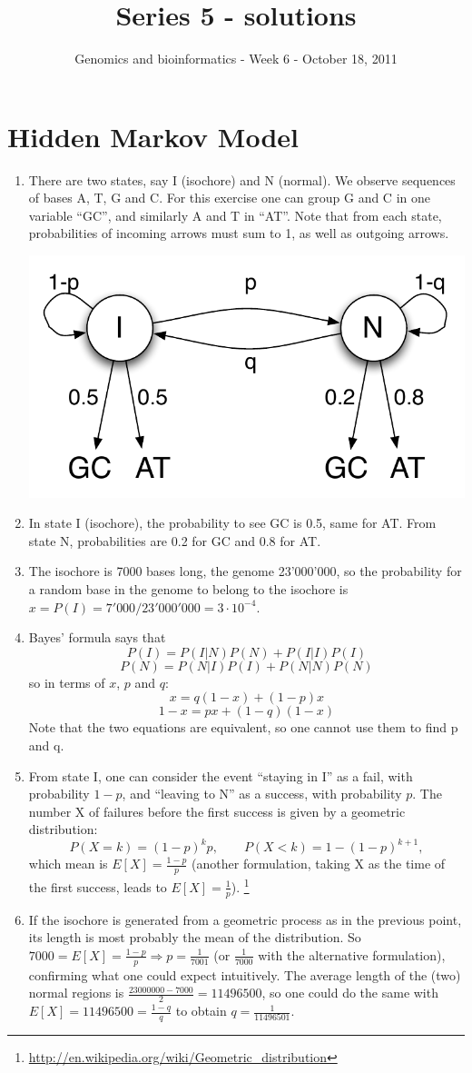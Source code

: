 \documentclass[a4paper,11pt]{article}
\title{Series 5 - solutions}
\date{}
\author{Genomics and bioinformatics - Week 6 - October 18, 2011}
\begin{document}
\maketitle

\section{Hidden Markov Model}
\begin{enumerate}
\item There are two states, say I (isochore) and N (normal). We observe sequences of bases A, T, G and C. For this exercise one can group G and C in one variable ``GC'', and similarly A and T in ``AT''. Note that from each state, probabilities of incoming arrows must sum to 1, as well as outgoing arrows.

\begin{center}
\includegraphics[height=0.2\textwidth]{hmm.pdf}
\end{center}

\item In state I (isochore), the probability to see GC is 0.5, same for AT. From state N, probabilities are 0.2 for GC and 0.8 for AT.
\item The isochore is 7000 bases long, the genome 23'000'000, so the probability for a random base in the genome to belong to the isochore is $x = P(I) = 7'000/23'000'000 = 3\cdot 10^{-4}$.
\item Bayes' formula says that 
$$ P(I) = P(I|N)P(N) + P(I|I)P(I) $$
$$ P(N) = P(N|I)P(I) + P(N|N)P(N) $$
so in terms of $x$, $p$ and $q$:
$$ x = q(1-x) + (1-p)x $$
$$ 1-x = px + (1-q)(1-x) $$
Note that the two equations are equivalent, so one cannot use them to find p and q.
\item From state I, one can consider the event ``staying in I'' as a fail, with probability $1-p$, and ``leaving to N'' as a success, with probability $p$. The number X of failures before the first success is given by a geometric distribution:
$$ P(X=k) = (1-p)^k p, \qquad P(X<k) = 1-(1-p)^{k+1}, $$
which mean is $E[X] = \frac{1-p}{p}$ (another formulation, taking X as the time of the first success, leads to $E[X] = \frac{1}{p}$).
\footnote{\url{http://en.wikipedia.org/wiki/Geometric_distribution}}
\item If the isochore is generated from a geometric process as in the previous point, its length is most probably the mean of the distribution. So $7000 = E[X] = \frac{1-p}{p} \Rightarrow p = \frac{1}{7001}$ (or $\frac{1}{7000}$ with the alternative formulation), confirming what one could expect intuitively. The average length of the (two) normal regions is $\frac{23000000-7000}{2} = 11496500$, so one could do the same with $E[X] = 11496500 = \frac{1-q}{q}$ to obtain $q = \frac{1}{11496501}$.
\end{enumerate}
\end{document}
